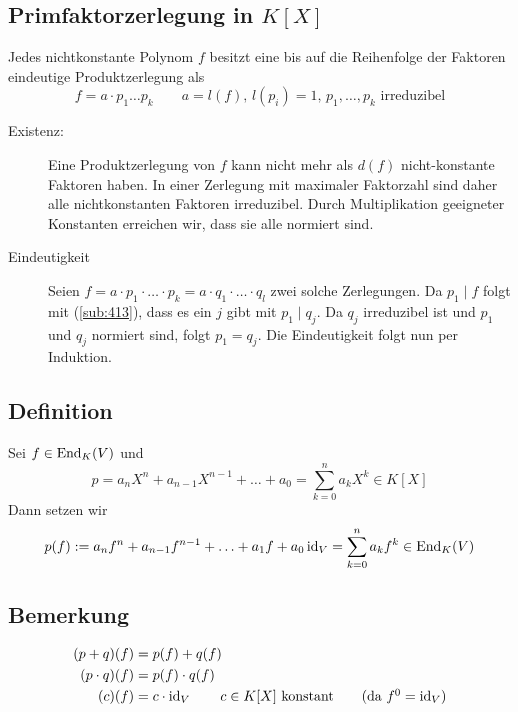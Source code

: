 \subsection{Primfaktorzerlegung in $K[X]$} %
\label{sub:418}
Jedes nichtkonstante Polynom $f$ besitzt eine bis auf die Reihenfolge der Faktoren eindeutige Produktzerlegung als 
\[
	f = a \cdot p_1 \ldots p_k \qquad  a=l(f), \, l(p_i)=1 , \, p_1, \ldots , p_k \text{ irreduzibel}
\]
\begin{description}
	\item[Existenz:] Eine Produktzerlegung von $f$ kann nicht mehr als $d(f)$ nicht-konstante Faktoren haben. In einer Zerlegung mit maximaler Faktorzahl sind daher
	alle nichtkonstanten Faktoren irreduzibel. Durch Multiplikation geeigneter Konstanten erreichen wir, dass sie alle normiert sind.
	\item[Eindeutigkeit] Seien $f=a \cdot p_1 \cdot \ldots \cdot p_k = a \cdot q_1 \cdot \ldots \cdot q_l$ zwei solche Zerlegungen. Da $p_1\mid f$ folgt mit 
	(\ref{sub:413}), 
	dass es ein $j$ gibt mit $p_1\mid q_j$. Da $q_j$ irreduzibel ist und $p_1$ und $q_j$ normiert sind, folgt $p_1=q_j$. Die Eindeutigkeit folgt nun per Induktion. \bewende 
\end{description}


\subsection[Definition von Polynomen in $\End_K(V)$]{Definition} %
\label{sub:419}
Sei $f \in \operatorname{End}_K(V)$ und 
\[
	p = a_n X^n + a_{n-1} X^{n-1} + \ldots + a_0  = \sum_{k=0}^{n} a_k X^k \in K[X]
\]
Dann setzen wir 
\[
	p(f) := a_n f^n + a_{n-1} f^{n-1} + \ldots + a_1 f + a_0 \operatorname{id}_V  = \sum_{k=0}^{n} a_k f^k \in \operatorname{End}_K(V)
\]

\subsection[Bemerkung über Rechenregeln]{Bemerkung} %
\label{sub:420}
\begin{align*}
	(p+q) (f) &= p(f) + q(f) \\
	(p \cdot q) (f) &= p(f) \cdot q(f) \\
	(c) (f) &= c \cdot \id_V \qquad c \in K[X] \text{ konstant} \tag{da $f^0 = \id_V$}
\end{align*}

